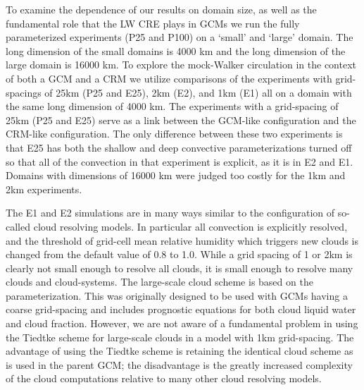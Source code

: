 \documentclass[draft]{agujournal2019}
\begin{document}
To examine the dependence of our results on domain size, as well as the fundamental role that the LW CRE plays in GCMs
we run the fully parameterized experiments (P25 and P100) on a `small' and `large' domain.  The long dimension of the small domains is 4000 km and the long dimension of the large domain is 16000 km.  
To explore the mock-Walker circulation in the context of both a GCM and a CRM we utilize 
comparisons of the experiments with grid-spacings of 25km (P25 and E25), 2km (E2), and 1km (E1) all on a domain with the same long dimension 
of 4000 km.  The experiments with a grid-spacing of 25km (P25 and E25) serve as a link between the GCM-like configuration and the CRM-like 
configuration.  The only difference between these two experiments is that E25 has both the shallow and deep convective parameterizations turned 
off so that all of the convection in that experiment is explicit, as it is in E2 and E1.  Domains with dimensions of 16000 km were judged too 
costly for the 1km and 2km experiments.  

The E1 and E2 simulations are in many ways similar to the configuration of so-called cloud resolving models.  
In particular all convection is explicitly resolved, %
and the threshold of grid-cell mean relative humidity which triggers new clouds is changed from the default value of 0.8 to 1.0.  
While a grid spacing of 1 or 2km is clearly not small enough
to resolve all clouds, it is small enough to resolve many clouds and cloud-systems.  
The large-scale cloud scheme is based on the  parameterization.  
This was originally designed to be used with GCMs having a coarse grid-spacing and includes prognostic equations for both 
cloud liquid water and cloud fraction.  
However, we are not aware of a fundamental problem in using the Tiedtke scheme for large-scale clouds in a model with 1km grid-spacing.   
The advantage of using the Tiedtke scheme is retaining the identical cloud scheme as is used in the parent GCM; the disadvantage is the greatly increased complexity of the 
cloud computations relative to many other cloud resolving models.    
\end{document}
